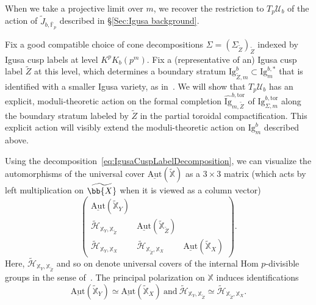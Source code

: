 \documentclass[letterpaper,11pt]{amsart}
\begin{document}
When we take a projective limit over $m$, we recover the restriction to $T_p\mathcal{U}_b$ of the action of $\widetilde{J}_{b,\overline{\mathbb{F}}_p}$ described in \S\ref{Sec:Igusa background}. 

Fix a good compatible
choice of cone decompositions $\Sigma = (\Sigma_{\widetilde{Z}})_{\widetilde{Z}}$ indexed by Igusa cusp labels at level $K^pK_{b}(p^m)$. 
Fix a (representative of an) Igusa cusp label $\widetilde{Z}$ at this level, which determines a boundary stratum $\mathrm{Ig}^b_{\widetilde{Z},m} \subset \mathrm{Ig}^{b,*}_m$ that is identified with a smaller Igusa variety, as in~\cite[Theorem 3.3.15]{CS2}. We will show that $T_p\mathcal{U}_b$ has an explicit, moduli-theoretic action on the formal completion $\widehat{\mathrm{Ig}}^{b,\mathrm{tor}}_{m,\widetilde{Z}}$ of $\mathrm{Ig}^{b,\mathrm{tor}}_{\Sigma, m}$ along the boundary stratum labeled by $\widetilde{Z}$ in the partial toroidal compactification. This explicit action will visibly extend the moduli-theoretic action on $\mathrm{Ig}^b_m$ described above. 

 Using the decomposition~\eqref{eq:IgusaCuspLabelDecomposition}, we can visualize the automorphisms of the universal cover $\underline{\mathrm{Aut}}(\widetilde{\mathbb{X}})$ as a $3\times 3$ matrix (which acts by left multiplication on $\widetilde{\bb{X}}$ when it is viewed as a column vector)
\begin{equation}\label{eq:ShapeAutX}
    \begin{pmatrix}
    \underline{\mathrm{Aut}}(\widetilde{\mathbb{X}}_Y) & \ & \ \\
    \widetilde{\mathcal{H}}_{\mathbb{X}_{Y},\mathbb{X}_{\widetilde{Z}}} & \underline{\mathrm{Aut}}(\widetilde{\mathbb{X}}_{\widetilde{Z}}) & \ \\
    \widetilde{\mathcal{H}}_{\mathbb{X}_{Y},\mathbb{X}_X} & \widetilde{\mathcal{H}}_{\mathbb{X}_{\widetilde{Z}},\mathbb{X}_X} & \underline{\mathrm{Aut}}(\widetilde{\mathbb{X}}_X)     
    \end{pmatrix}.
\end{equation}
Here, $\widetilde{\mathcal{H}}_{\mathbb{X}_{Y},\mathbb{X}_{\widetilde{Z}}}$ and so on denote universal covers of the internal Hom $p$-divisible groups in the sense of~\cite[\S 4.1.6]{CS17}. The principal polarization on $\mathbb{X}$ induces identifications 
\[
\underline{\mathrm{Aut}}(\widetilde{\mathbb{X}}_Y)\simeq \underline{\mathrm{Aut}}(\widetilde{\mathbb{X}}_X)\ \mathrm{and}\ \widetilde{\mathcal{H}}_{\mathbb{X}_{Y},\mathbb{X}_{\widetilde{Z}}}\simeq \widetilde{\mathcal{H}}_{\mathbb{X}_{\widetilde{Z}},\mathbb{X}_X}.
\]
\end{document}
